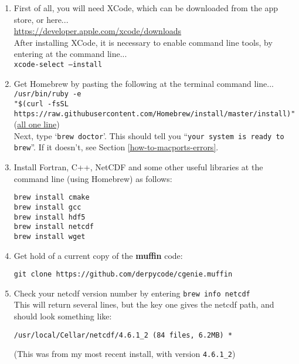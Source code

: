 \documentclass[11pt,fleqn]{book} %
\begin{document}
\begin{enumerate}

\item First of all, you will need XCode, which can be downloaded from the app store, or here...
\\\href{https://developer.apple.com/xcode/downloads}{https://developer.apple.com/xcode/downloads} \\After installing XCode, it is necessary to enable command line tools, by entering at the command line...\\
\texttt{xcode-select --install}

\item Get Homebrew by pasting the following at the terminal command line...
\\ \texttt{/usr/bin/ruby -e
\small
\\"\$(curl -fsSL https://raw.githubusercontent.com/Homebrew/install/master/install)"
\normalsize}
(\uline{all one line})
\\Next, type `\texttt{brew doctor}'. This should tell you ``\texttt{your system is ready to brew}''. If it doesn't, see Section \ref{how-to-macports-errors}.
\item Install Fortran, C++, NetCDF and some other useful libraries at the command line (using Homebrew) as follows:

\vspace{-5pt}\begin{verbatim}
brew install cmake
brew install gcc
brew install hdf5
brew install netcdf
brew install wget
\end{verbatim}

\item Get hold of a current copy of the \textbf{muffin} code:

\begin{verbatim}
git clone https://github.com/derpycode/cgenie.muffin
\end{verbatim}

\item Check your netcdf version number by entering \texttt{brew info netcdf}\\
This will return several lines, but the key one gives the netcdf path, and should look something like:
\vspace{-5pt}\begin{verbatim}
/usr/local/Cellar/netcdf/4.6.1_2 (84 files, 6.2MB) *
\end{verbatim}\vspace{-5pt}
(This was from my most recent install, with version \texttt{4.6.1\_2})


\end{enumerate}
\end{document}
